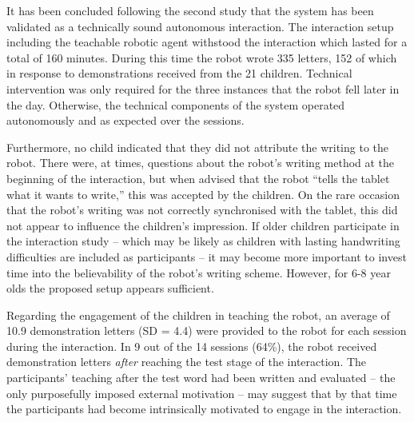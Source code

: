 \documentclass{sig-alternate}
\begin{document}

It has been concluded following the second study that the system has 
been validated as a technically sound autonomous interaction. 
The interaction setup including the teachable
robotic agent withstood the interaction which lasted for a total of 160 minutes. 
During this time the robot wrote 335 letters, 152 of which in response to
demonstrations received from the 21 children. Technical 
intervention was only required for the three instances that the robot fell 
later in the day. Otherwise, the technical components of the system operated 
autonomously and as expected over the sessions.

Furthermore, no child indicated that they did not attribute the writing
to the robot. There were, at times, 
    questions about the robot's writing method at the beginning of the interaction,
    but when advised that the robot ``tells the tablet what it wants to write,''
    this was accepted by the children. 
    On the rare occasion that the
    robot's writing was not correctly synchronised with the tablet, this did
    not appear to influence the children's impression. 
    If older children participate in the interaction study --
    which may be likely as children with lasting handwriting difficulties are included
    as participants -- it may become more important to invest time into the
    believability of the robot's writing scheme. However, for 6-8 year olds the
    proposed setup appears sufficient.

Regarding the engagement of the children in teaching the robot, 
    an average of 10.9 demonstration letters (SD = 4.4) were
    provided to the robot for each session during the interaction.
    In 9 out of the 14 sessions (64\%), the robot received demonstration letters
    \emph{after} reaching the test stage of the interaction. The participants'
    teaching after the test word had been written and evaluated -- the only
    purposefully imposed external motivation -- may suggest that by that time
    the participants had become intrinsically motivated to engage in the
    interaction.
\end{document}
